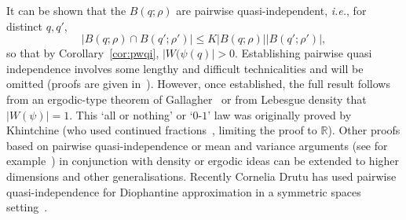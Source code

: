 \documentclass[reqno]{amsart}
\renewcommand{\le}{\leqslant}
\newcommand{\R}{{\mathbb{R}}}
\newcommand{\0}{{\mathbf{0}}}
\newcommand{\DA}{Diophantine approximation}
\newcommand{\ie}{{\it{i.e.}}}
\newcommand{\K}{Khintchine}
\def\Bqr{B(q;\rho)}
\def\Bqrp{B(q';\rho')}
\begin{document}
It can be shown that the $\Bqr$
are pairwise quasi-independent, \ie, for distinct $q,q'$,
\begin{equation*}
  |\Bqr\cap \Bqrp|\le K |\Bqr| |\Bqrp|,
\end{equation*}
so that by Corollary~\ref{cor:pwqi}, $|W(\psi(q)|>0$.  Establishing
pairwise quasi independence involves some lengthy and difficult
technicalities and will be omitted (proofs are given
in~\cite{Sprindzuk,Sullivan82}).  However, once established, the full
result follows from an ergodic-type theorem of
Gallagher~\cite{Gallagher65} or from Lebesgue density that $|W(\psi)|=1$.
This `all or nothing' or `$0$-$1$' law was originally proved by \K{}
(who used continued fractions~\cite{KhCF}, limiting the proof to
$\R$).  Other proofs based on pairwise quasi-independence or mean and
variance arguments (see for example~\cite[Chaper~VII]{Casselshort}) in
conjunction with density or ergodic ideas can be extended to higher
dimensions and other generalisations. Recently Cornelia Drutu has used
pairwise quasi-independence for \DA{} in a symmetric spaces
setting~\cite{drutu05}.
\end{document}
